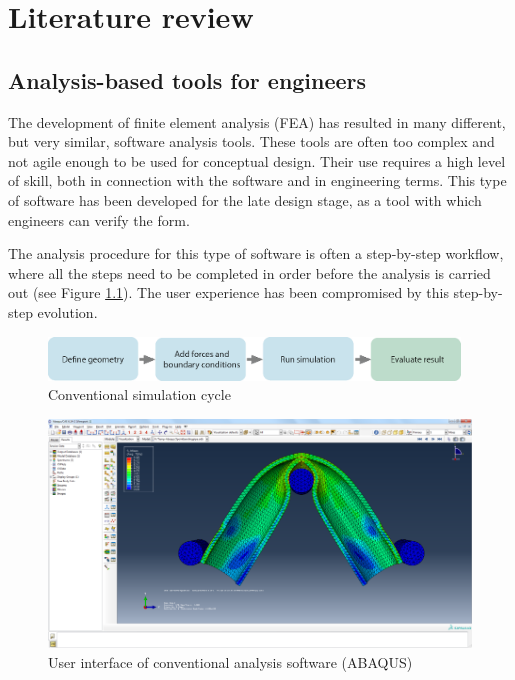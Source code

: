 \chapter{Literature review}
\label{ch:Literature review}
\section{Analysis-based tools for engineers}
The development of finite element analysis (FEA) has resulted in many different, but very similar, software analysis tools. These tools are often too complex and not agile enough to be used for conceptual design. Their use requires a high level of skill, both in connection with the software and in engineering terms. This type of software has been developed for the late design stage, as a tool with which engineers can verify the form. 

 The analysis procedure for this type of software is often a step-by-step workflow, where all the steps need to be completed in order before the analysis is carried out (see Figure \ref{fig:conventional-cycle}). The user experience has been compromised by this step-by-step evolution.

\begin{figure}
  \includegraphics[width=310pt]{graphics/conventional-cycle.eps}
  \caption{Conventional simulation cycle}
  \label{fig:conventional-cycle}
\end{figure}

\begin{figure}
  \includegraphics[width=350pt]{graphics/abaqus.png}
  \caption{User interface of conventional analysis software (ABAQUS)}
  \label{fig:abaqus}
\end{figure}

